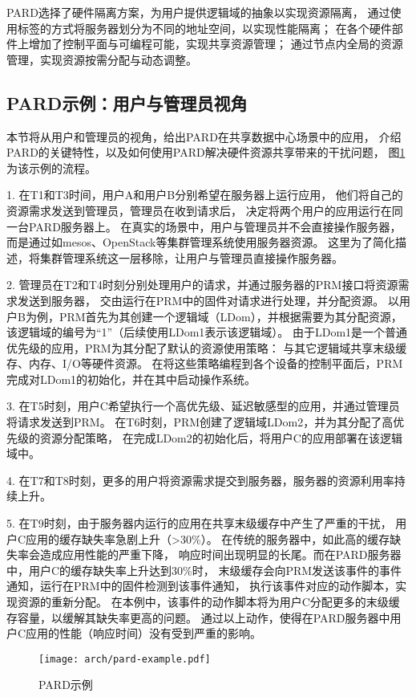 PARD选择了硬件隔离方案，为用户提供逻辑域的抽象以实现资源隔离，
通过使用标签的方式将服务器划分为不同的地址空间，以实现性能隔离；
在各个硬件部件上增加了控制平面与可编程可能，实现共享资源管理；
通过节点内全局的资源管理，实现资源按需分配与动态调整。

\subsection{PARD示例：用户与管理员视角}

本节将从用户和管理员的视角，给出PARD在共享数据中心场景中的应用，
介绍PARD的关键特性，以及如何使用PARD解决硬件资源共享带来的干扰问题，
图\ref{fig:pard-example}为该示例的流程。

1. 在T1和T3时间，用户A和用户B分别希望在服务器上运行应用，
他们将自己的资源需求发送到管理员，管理员在收到请求后，
决定将两个用户的应用运行在同一台PARD服务器上。
在真实的场景中，用户与管理员并不会直接操作服务器，
而是通过如mesos\cite{}、OpenStack\cite{}等集群管理系统使用服务器资源。
这里为了简化描述，将集群管理系统这一层移除，让用户与管理员直接操作服务器。

2. 管理员在T2和T4时刻分别处理用户的请求，并通过服务器的PRM接口将资源需求发送到服务器，
交由运行在PRM中的固件对请求进行处理，并分配资源。
以用户B为例，PRM首先为其创建一个逻辑域（LDom），并根据需要为其分配资源，
该逻辑域的编号为“1”（后续使用LDom1表示该逻辑域）。
由于LDom1是一个普通优先级的应用，PRM为其分配了默认的资源使用策略：
与其它逻辑域共享末级缓存、内存、I/O等硬件资源。
在将这些策略编程到各个设备的控制平面后，PRM完成对LDom1的初始化，并在其中启动操作系统。

3. 在T5时刻，用户C希望执行一个高优先级、延迟敏感型的应用，并通过管理员将请求发送到PRM。
在T6时刻，PRM创建了逻辑域LDom2，并为其分配了高优先级的资源分配策略，
在完成LDom2的初始化后，将用户C的应用部署在该逻辑域中。

4. 在T7和T8时刻，更多的用户将资源需求提交到服务器，服务器的资源利用率持续上升。

5. 在T9时刻，由于服务器内运行的应用在共享末级缓存中产生了严重的干扰，
用户C应用的缓存缺失率急剧上升（>30\%）。
在传统的服务器中，如此高的缓存缺失率会造成应用性能的严重下降，
响应时间出现明显的长尾。而在PARD服务器中，用户C的缓存缺失率上升达到30\%时，
末级缓存会向PRM发送该事件的事件通知，运行在PRM中的固件检测到该事件通知，
执行该事件对应的动作脚本，实现资源的重新分配。
在本例中，该事件的动作脚本将为用户C分配更多的末级缓存容量，以缓解其缺失率更高的问题。
通过以上动作，使得在PARD服务器中用户C应用的性能（响应时间）没有受到严重的影响。

\begin{figure}[t]
  \centering
  \texttt{[image: arch/pard-example.pdf]}
  \caption{PARD示例}
  \label{fig:pard-example}
\end{figure}


